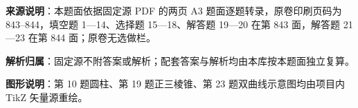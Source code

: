 

\begin{gknotice}
\textbf{来源说明}：本题面依据固定源 PDF 的两页 A3 题面逐题转录，原卷印刷页码为 843–844，填空题 1—14、选择题 15—18、解答题 19—20 在第 843 面，解答题 21—23 在第 844 面；原卷无选做栏。

\textbf{解析归属}：固定源不附答案或解析；配套答案与解析均由本库按本题面独立复算。

\textbf{图形说明}：第 10 题圆柱、第 19 题正三棱锥、第 23 题双曲线示意图均由项目内 TikZ 矢量源重绘。
\end{gknotice}


